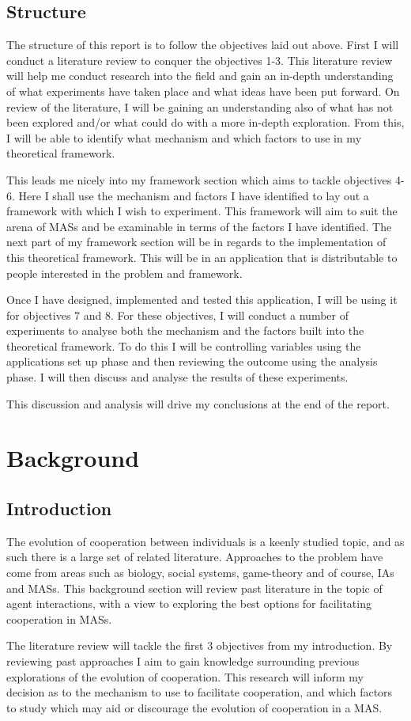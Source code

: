 \documentclass[]{final_report}
\begin{document}
\section{Structure}
The structure of this report is to follow the objectives laid out above. First I will conduct a literature review to conquer the objectives 1-3. This literature review will help me conduct research into the field and gain an in-depth understanding of what experiments have taken place and what ideas have been put forward. On review of the literature, I will be gaining an understanding also of what has not been explored and/or what could do with a more in-depth exploration. From this, I will be able to identify what mechanism and which factors to use in my theoretical framework.\par
This leads me nicely into my framework section which aims to tackle objectives 4-6. Here I shall use the mechanism and factors I have identified to lay out a framework with which I wish to experiment. This framework will aim to suit the arena of MASs and be examinable in terms of the factors I have identified. The next part of my framework section will be in regards to the implementation of this theoretical framework. This will be in an application that is distributable to people interested in the problem and framework.\par
Once I have designed, implemented and tested this application, I will be using it for objectives 7 and 8. For these objectives, I will conduct a number of experiments to analyse both the mechanism and the factors built into the theoretical framework. To do this I will be controlling variables using the applications set up phase and then reviewing the outcome using the analysis phase. I will then discuss and analyse the results of these experiments.\par
This discussion and analysis will drive my conclusions at the end of the report.


\chapter{Background}
\label{chap:background}
\section{Introduction}
The evolution of cooperation between individuals is a keenly studied topic, and as such there is a large set of related literature. Approaches to the problem have come from areas such as biology, social systems, game-theory and of course, IAs and MASs. This background section will review past literature in the topic of agent interactions, with a view to exploring the best options for facilitating cooperation in MASs.\par
The literature review will tackle the first 3 objectives from my introduction. By reviewing past approaches I aim to gain knowledge surrounding previous explorations of the evolution of cooperation. This research will inform my decision as to the mechanism to use to facilitate cooperation, and which factors to study which may aid or discourage the evolution of cooperation in a MAS.
\end{document}
